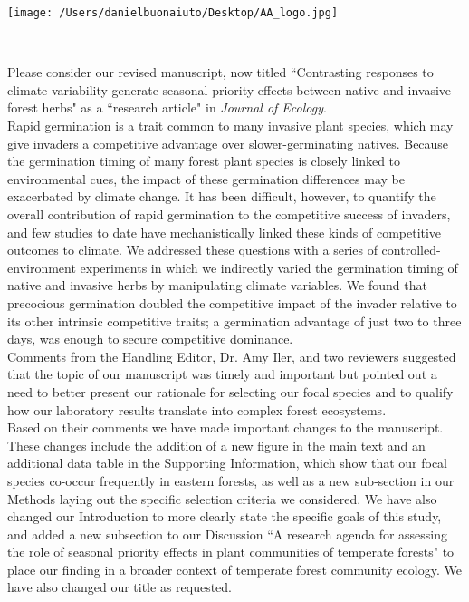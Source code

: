 \documentclass[11 pt]{article}
\begin{document}

\def\labelitemi{--}
\parindent=24pt
\noindent\texttt{[image: /Users/danielbuonaiuto/Desktop/AA\_logo.jpg]}

\\
\vspace{1.5ex}

\noindent Please consider our revised manuscript, now titled ``Contrasting responses to climate variability generate seasonal priority effects between native and invasive forest herbs" as a ``research article" in \textit{Journal of Ecology}.\\

\noindent Rapid germination is  a trait common to many invasive plant species, which may give invaders a competitive advantage over slower-germinating natives. Because the germination timing of many forest plant species is closely linked to environmental cues, the impact of these germination differences may be exacerbated by climate change. It has been difficult, however, to quantify the overall contribution of rapid germination to the competitive success of invaders, and few studies to date have mechanistically linked these kinds of competitive outcomes to climate. We addressed these questions with a series of controlled-environment experiments in which we indirectly varied the germination timing of native and invasive herbs by manipulating climate variables. We found that precocious germination doubled the competitive impact of the invader relative to its other intrinsic competitive traits; a germination advantage of just two to three days, was enough to secure competitive dominance.\\

\noindent Comments from the Handling Editor, Dr. Amy Iler, and two reviewers suggested that the topic of our manuscript was timely and important but pointed out a need to better present our rationale for selecting our focal species and to qualify how our laboratory results translate into complex forest ecosystems.\\

\noindent Based on their comments we have made important changes to the manuscript. These changes include the addition of a new figure in the main text and an additional data table in the Supporting Information, which show that our focal species co-occur frequently in eastern forests, as well as a new sub-section in our Methods laying out the specific selection criteria we considered. We have also changed our Introduction to more clearly state the specific goals of this study, and added a new subsection to our Discussion ``A research agenda for assessing the role of seasonal priority effects in plant communities of temperate forests" to place our finding in a broader context of temperate forest community ecology. We have also changed our title as requested. \\ 
\end{document}
